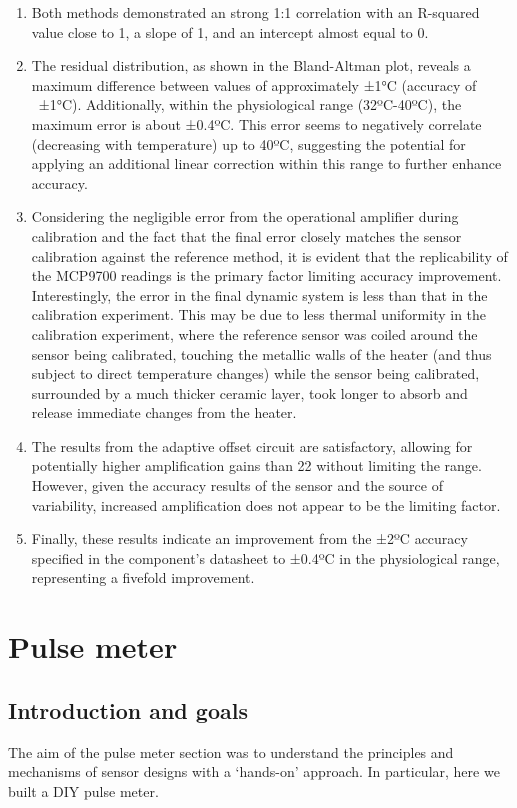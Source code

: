 \documentclass[conference]{IEEEtran}
\begin{document}
      \begin{enumerate}
      \item Both methods demonstrated an strong 1:1 correlation with an R-squared value close to 1, a slope of 1, and an intercept almost equal to 0.
      \item The residual distribution, as shown in the Bland-Altman plot, reveals a maximum difference between values of approximately ±1°C (accuracy of ~±1°C). Additionally, within the physiological range (32ºC-40ºC), the maximum error is about ±0.4ºC. This error seems to negatively correlate (decreasing with temperature) up to 40ºC, suggesting the potential for applying an additional linear correction within this range to further enhance accuracy.
      \item Considering the negligible error from the operational amplifier during calibration and the fact that the final error closely matches the sensor calibration against the reference method, it is evident that the replicability of the MCP9700 readings is the primary factor limiting accuracy improvement. 
      Interestingly, the error in the final dynamic system is less than that in the calibration experiment. This may be due to less thermal uniformity in the calibration experiment, 
      where the reference sensor was coiled around the sensor being calibrated, touching the metallic walls of the heater (and thus subject to direct temperature changes) while the 
      sensor being calibrated, surrounded by a much thicker ceramic layer, took longer to absorb and release immediate changes from the heater.
      \item The results from the adaptive offset circuit are satisfactory, allowing for potentially higher amplification gains than 22 without limiting the range. However, given the accuracy results of the sensor and the source of variability, increased amplification does not appear to be the limiting factor.
      \item Finally, these results indicate an improvement from the ±2ºC accuracy specified in the component's datasheet to ±0.4ºC in the physiological range, representing a fivefold improvement. 
      
      \end{enumerate}

\section{Pulse meter} %
   \subsection{Introduction and goals}
   The aim of the pulse meter section was to understand the principles and mechanisms of sensor designs with a `hands-on’ approach. In particular, here we built a DIY pulse meter. 
\end{document}
